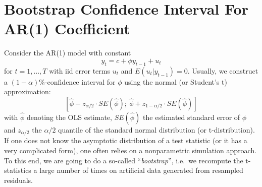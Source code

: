 \section[Bootstrap Confidence Interval For AR{(1)} Coefficient]{Bootstrap Confidence Interval For AR{(1)} Coefficient\label{ex:BootstrapConfidenceIntervalARone}}
Consider the AR{(1)} model with constant
\begin{equation*}
y_{t}=c +\phi y_{t-1}+u_{t}
\end{equation*}
for \(t=1,\ldots ,T\) with iid error terms \(u_{t}\) and \(E(u_{t}|y_{t-1})=0\).
Usually, we construct a \( (1-\alpha)\% \)-confidence interval for \( \phi \) using the normal (or Student's t) approximation:
\begin{equation*}
\left[ \hat{\phi}-z_{\alpha/2}\cdot SE(\hat{\phi});\ \hat{\phi}+z_{1-\alpha/2}\cdot SE(\hat{\phi})\right]
\end{equation*}
  with \(\hat{\phi}\) denoting the OLS estimate,
  \(SE(\hat{\phi})\) the estimated standard error of \( \phi \)
  and \(z_{\alpha/2}\) the \(\alpha/2\) quantile of the standard normal distribution (or t-distribution).
If one does not know the asymptotic distribution of a test statistic
  (or it has a very complicated form),
  one often relies on a nonparametric simulation approach.
To this end, we are going to do a so-called \enquote{\emph{bootstrap}},
  i.e.\ we recompute the t-statistics a large number of times on artificial data
  generated from resampled residuals.\\

